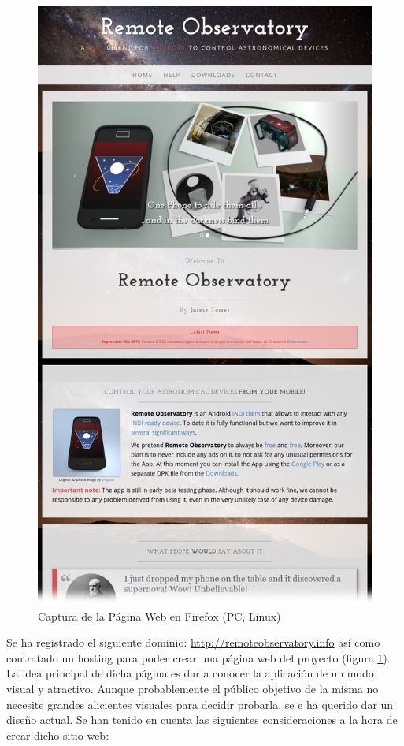 \begin{figure}
 \centering
 \includegraphics[width=12cm]{../images/webpage2.jpg}
 \caption{Captura de la Página Web en Firefox (PC, Linux)}
 \label{fig:web}
\end{figure}

Se ha registrado el siguiente dominio: \url{http://remoteobservatory.info} así como contratado un hosting para poder crear una página web del proyecto (figura \ref{fig:web}). La idea principal de dicha página es dar a conocer la aplicación de un modo visual y atractivo. Aunque probablemente el público objetivo de la misma no necesite grandes alicientes visuales para decidir probarla, se e ha querido dar un diseño actual. Se han tenido en cuenta las siguientes consideraciones a la hora de crear dicho sitio web:

